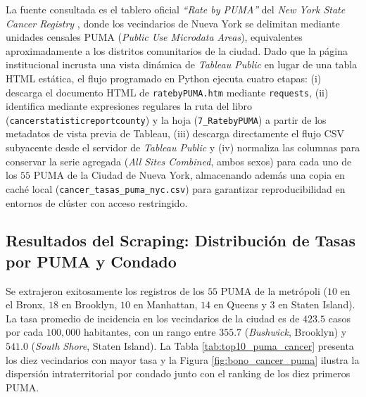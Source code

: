 \documentclass[11pt,a4paper]{article}
\begin{document}
La fuente consultada es el tablero oficial \textit{``Rate by PUMA''} del \textit{New York State Cancer Registry} \cite{nys_cancer_registry_2026}, donde los vecindarios de Nueva York se delimitan mediante unidades censales PUMA (\textit{Public Use Microdata Areas}), equivalentes aproximadamente a los distritos comunitarios de la ciudad. Dado que la página institucional incrusta una vista dinámica de \textit{Tableau Public} en lugar de una tabla HTML estática, el flujo programado en Python ejecuta cuatro etapas: (i) descarga el documento HTML de \texttt{ratebyPUMA.htm} mediante \texttt{requests}, (ii) identifica mediante expresiones regulares la ruta del libro (\texttt{cancerstatisticreportcounty}) y la hoja (\texttt{7\_RatebyPUMA}) a partir de los metadatos de vista previa de Tableau, (iii) descarga directamente el flujo CSV subyacente desde el servidor de \textit{Tableau Public} y (iv) normaliza las columnas para conservar la serie agregada (\textit{All Sites Combined}, ambos sexos) para cada uno de los $55$ PUMA de la Ciudad de Nueva York, almacenando además una copia en caché local (\texttt{cancer\_tasas\_puma\_nyc.csv}) para garantizar reproducibilidad en entornos de clúster con acceso restringido.

\subsection{Resultados del Scraping: Distribución de Tasas por PUMA y Condado}
\label{subsec:bono_puma}

Se extrajeron exitosamente los registros de los $55$ PUMA de la metrópoli ($10$ en el Bronx, $18$ en Brooklyn, $10$ en Manhattan, $14$ en Queens y $3$ en Staten Island). La tasa promedio de incidencia en los vecindarios de la ciudad es de $423.5$ casos por cada $100,000$ habitantes, con un rango entre $355.7$ (\textit{Bushwick}, Brooklyn) y $541.0$ (\textit{South Shore}, Staten Island). La Tabla \ref{tab:top10_puma_cancer} presenta los diez vecindarios con mayor tasa y la Figura \ref{fig:bono_cancer_puma} ilustra la dispersión intraterritorial por condado junto con el ranking de los diez primeros PUMA.
\end{document}
